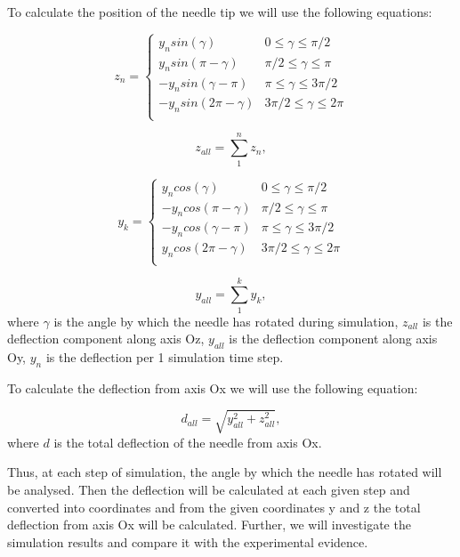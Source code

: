 \documentclass[a4paper]{jpconf}
\begin{document}
To calculate the position of the needle tip we will use the following equations:

\begin{equation} \label{eq7}
z_{n} = 
 \begin{cases}
   y_{n} sin(\gamma) &{ 0 \leq \gamma \leq \pi/2 }\\
   y_{n} sin(\pi - \gamma) &{ \pi/2 \leq \gamma \leq \pi }\\
  - y_{n} sin( \gamma - \pi) &{ \pi \leq \gamma \leq 3\pi/2 }\\
   - y_{n} sin(2\pi -  \gamma) &{ 3\pi/2 \leq \gamma \leq 2\pi }\\
 \end{cases}
\end{equation}

\begin{equation} \label{eq8}
z_{all} = \sum\limits_{1}^{n} z_{n},
\end{equation}

\begin{equation} \label{eq9}
y_{k} = 
 \begin{cases}
   y_{n} cos(\gamma) &{ 0 \leq \gamma \leq \pi/2 }\\
   - y_{n} cos(\pi - \gamma) &{ \pi/2 \leq \gamma \leq \pi }\\
  - y_{n} cos( \gamma - \pi) &{ \pi \leq \gamma \leq 3\pi/2 }\\
    y_{n} cos(2\pi -  \gamma) &{ 3\pi/2 \leq \gamma \leq 2\pi }\\
 \end{cases}
\end{equation}

\begin{equation} \label{eq10}
y_{all} = \sum\limits_{1}^{k} y_{k},
\end{equation}
where  $\gamma$  is the angle by which the needle has rotated during simulation, $z_{all} $  is the deflection component along axis Oz, $y_{all}$  is the deflection component along axis Oy, $y_{n}$  is the deflection per 1 simulation time step.

To calculate the deflection from axis Ox we will use the following equation:

\begin{equation} \label{eq11}
d_{all} = \sqrt{y_{all}^2  +  z_{all} ^2},
\end{equation}
where  $d$  is the total deflection of the needle from axis Ox.

Thus, at each step of simulation, the angle by which the needle has rotated will be analysed. Then the deflection will be calculated at each given step and converted into coordinates and from the given coordinates y and z the total deflection from axis Ox will be calculated. Further, we will investigate the simulation results and compare it with the experimental evidence.
\end{document}
